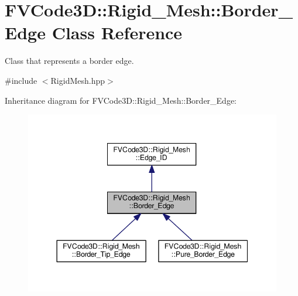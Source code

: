 \hypertarget{classFVCode3D_1_1Rigid__Mesh_1_1Border__Edge}{}\section{F\+V\+Code3D\+:\+:Rigid\+\_\+\+Mesh\+:\+:Border\+\_\+\+Edge Class Reference}
\label{classFVCode3D_1_1Rigid__Mesh_1_1Border__Edge}


Class that represents a border edge.  




{\ttfamily \#include $<$Rigid\+Mesh.\+hpp$>$}



Inheritance diagram for F\+V\+Code3D\+:\+:Rigid\+\_\+\+Mesh\+:\+:Border\+\_\+\+Edge\+:
\nopagebreak
\begin{figure}[H]
\begin{center}
\leavevmode
\includegraphics[width=344pt]{classFVCode3D_1_1Rigid__Mesh_1_1Border__Edge__inherit__graph}
\end{center}
\end{figure}


